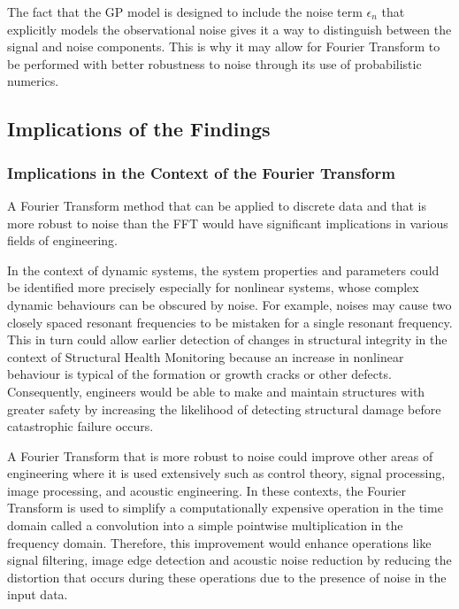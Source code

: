 \documentclass[12pt]{article}
\begin{document}
    The fact that the GP model is designed to include the noise term $\epsilon_n$ that explicitly models the observational noise gives it a way to distinguish between the signal and noise components.
    This is why it may allow for Fourier Transform to be performed with better robustness to noise through its use of probabilistic numerics.

    \subsection{Implications of the Findings}

    \subsubsection{Implications in the Context of the Fourier Transform}

    A Fourier Transform method that can be applied to discrete data and that is more robust to noise than the FFT would have significant implications in various fields of engineering.

    In the context of dynamic systems, the system properties and parameters could be identified more precisely especially for nonlinear systems, whose complex dynamic behaviours can be obscured by noise.
    For example, noises may cause two closely spaced resonant frequencies to be mistaken for a single resonant frequency.
    This in turn could allow earlier detection of changes in structural integrity in the context of Structural Health Monitoring because an increase in nonlinear behaviour is typical of the formation or growth cracks or other defects.
    Consequently, engineers would be able to make and maintain structures with greater safety by increasing the likelihood of detecting structural damage before catastrophic failure occurs.

    A Fourier Transform that is more robust to noise could improve other areas of engineering where it is used extensively such as control theory, signal processing, image processing, and acoustic engineering.
    In these contexts, the Fourier Transform is used to simplify a computationally expensive operation in the time domain called a convolution into a simple pointwise multiplication in the frequency domain.
    Therefore, this improvement would enhance operations like signal filtering, image edge detection and acoustic noise reduction by reducing the distortion that occurs during these operations due to the presence of noise in the input data.
\end{document}
